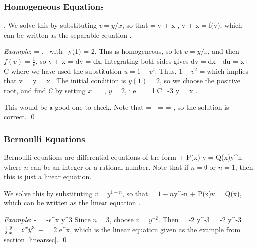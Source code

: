 \documentclass[12pt]{book}
\begin{document}
\subsubsection{Homogeneous Equations}
\be 
{}.
\ee
We solve this by substituting $v=y/x$, so that
\bee
{} = v + x ,
\quad \implies \quad
v + x  = f(v),
\eee
which can be written as the separable equation
\bee
{}.
\eee

\noindent \emph{Example}:
\bee
{} = , \mbox{ with } y(1) = 2.
\eee
This is homogeneous, so let $v=y/x$, and then $f(v) = \frac{1}{v}$, so
\bee
v + x  =  
\quad \implies \quad
{} dv = dx.
\eee
Integrating both sides gives
\bee
\int {}dv = \int {} dx
\quad \implies \quad
- \int {}du = \ln x+ \ln C
\eee
where we have used the substitution $u = 1-v^2$. Thus,
\bee
\ln\(1-v^2 \) = \ln {}
\eee
which implies that 
\bee
v = \pm {} 
\quad \implies \quad 
y = \pm x .
\eee
The initial condition is $y(1)=2$, so we choose the positive root, and
find $C$ by setting $x=1$, $y=2$, i.e.\
 = 1 \times {} 
\quad \implies \quad 
C=-3
\quad \implies \quad 
y = x .
\eee

This would be a good one to check. Note that 
\bee
{} =  - 
= \frac{1}{\sqrt{1+\frac{3}{x^2}}}
= , 
\eee
so the solution is correct. \qed

\subsubsection{Bernoulli Equations}
Bernoulli equations are differential equations of the form
\bee
{} + P(x) y = Q(x)y^n
\eee
where $n$ can be an integer or a rational number. Note that if
$n=0$ or $n=1$, then this is just a linear equation.

We solve this by substituting $v=y^{1-n}$, so that
\bee
{} = \(1-n\)y^{-n}
\quad \implies \quad
{}  + P(x)v = Q(x),
\eee
which can be written as the linear equation
\be
{}.
\ee

\noindent\emph{Example}:
\bee
{} -\half {} = -e^x y^3
\eee
Since $n=3$, choose $v=y^{-2}$. Then
\bee
{} = -2 y^{-3}  
\quad \implies \quad
{} = -2 y^{-3}\( \half \frac{y}{x}  - e^x y^3\)
\quad \implies \quad
{} +  = 2 e^x,
\eee
which is the linear equation given as the example from section \ref{linearsec}. 
\qed
\end{document}
